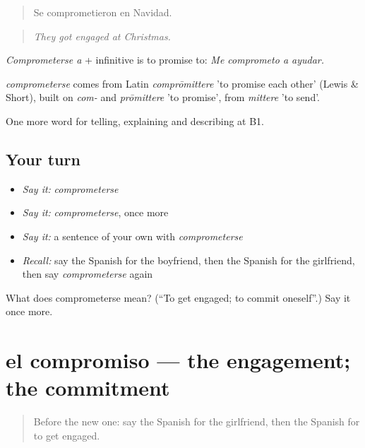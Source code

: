 \begin{quote}
Se comprometieron en Navidad.
\end{quote}

\begin{quote}
\emph{They got engaged at Christmas.}
\end{quote}

\emph{Comprometerse a} + infinitive is to promise to: \emph{Me comprometo a ayudar.}

\begin{cousinweb}
\emph{comprometerse} comes from Latin \emph{comprōmittere} 'to promise each other' (Lewis \& Short), built on \emph{com-} and \emph{prōmittere} 'to promise', from \emph{mittere} 'to send'.
\end{cousinweb}

\begin{grammarlens}[title={What you've built}]
One more word for telling, explaining and describing at B1.
\end{grammarlens}

\subsection*{Your turn}
\begin{itemize}
\raggedright
  \item \emph{Say it:} \emph{comprometerse}
  \item \emph{Say it:} \emph{comprometerse}, once more
  \item \emph{Say it:} a sentence of your own with \emph{comprometerse}
  \item \emph{Recall:} say the Spanish for the boyfriend, then the Spanish for the girlfriend, then say \emph{comprometerse} again
\end{itemize}

\begin{tcolorbox}[breakable,colback=teal!4,colframe=teal!35!black,title={Before you move on}]
What does comprometerse mean? (\textquotedblleft{}To get engaged; to commit oneself\textquotedblright{}.) Say it once more.
\end{tcolorbox}
\section[el compromiso]{el compromiso — the engagement; the commitment}

\label{lesson:ES-C547-compromiso}



\begin{quote}
Before the new one: say the Spanish for the girlfriend, then the Spanish for to get engaged.
\end{quote}

